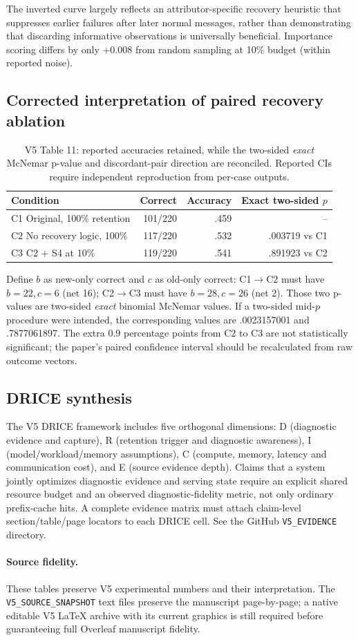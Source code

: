 The inverted curve largely reflects an attributor-specific recovery
heuristic that suppresses earlier failures after later normal messages,
rather than demonstrating that discarding informative observations is
universally beneficial. Importance scoring differs by only +0.008
from random sampling at 10\% budget (within reported noise).

\subsection{Corrected interpretation of paired recovery ablation}
\begin{table}[ht]\centering\footnotesize
\caption{V5 Table 11: reported accuracies retained, while the
two-sided \emph{exact} McNemar p-value and discordant-pair direction
are reconciled. Reported CIs require independent reproduction from
per-case outputs.}
\label{tab:v5recover}
\begin{tabular}{lrrr}\toprule
Condition & Correct & Accuracy & Exact two-sided $p$\\\midrule
C1 Original, 100\% retention & 101/220 & .459 & --\\
C2 No recovery logic, 100\% & 117/220 & .532 & .003719 vs C1\\
C3 C2 + S4 at 10\% & 119/220 & .541 & .891923 vs C2\\
\bottomrule\end{tabular}\end{table}
Define $b$ as new-only correct and $c$ as old-only correct:
C1$\to$C2 must have $b=22,c=6$ (net 16);
C2$\to$C3 must have $b=28,c=26$ (net 2).
Those two p-values are two-sided \emph{exact} binomial McNemar values.
If a two-sided mid-$p$ procedure were intended, the corresponding
values are .0023157001 and .7877061897. The extra 0.9 percentage points
from C2 to C3 are not statistically significant; the paper's paired
confidence interval should be recalculated from raw outcome vectors.

\subsection{DRICE synthesis}
The V5 DRICE framework includes five orthogonal dimensions:
D (diagnostic evidence and capture), R (retention trigger and diagnostic
awareness), I (model/workload/memory assumptions), C (compute, memory,
latency and communication cost), and E (source evidence depth).
Claims that a system jointly optimizes diagnostic evidence and serving
state require an explicit shared resource budget and an observed
diagnostic-fidelity metric, not only ordinary prefix-cache hits.
A complete evidence matrix must attach claim-level section/table/page
locators to each DRICE cell. See the GitHub \texttt{V5\_EVIDENCE} directory.

\paragraph*{Source fidelity.} These tables preserve V5 experimental
numbers and their interpretation. The \texttt{V5\_SOURCE\_SNAPSHOT} text files
preserve the manuscript page-by-page; a native editable V5 LaTeX
archive with its current graphics is still required before guaranteeing
full Overleaf manuscript fidelity.
